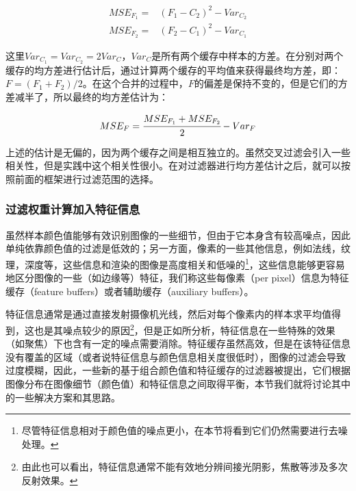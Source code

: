 \begin{equation}
	\begin{aligned}
		MSE_{F_1}=&(F_1-C_2)^{2}-Var_{C_2}\\
		MSE_{F_2}=&(F_2-C_1)^{2}-Var_{C_1}
	\end{aligned}
\end{equation}

\noindent 这里$Var_{C_1}=Var_{C_2}=2Var_C$，$Var_C$是所有两个缓存中样本的方差。在分别对两个缓存的均方差进行估计后，通过计算两个缓存的平均值来获得最终均方差，即：$F=(F_1+F_2)/2$。在这个合并的过程中，$F$的偏差是保持不变的，但是它们的方差减半了，所以最终的均方差估计为：

\begin{equation}
	MSE_F= \cfrac{MSE_{F_1}+MSE_{F_2}}{2}-Var_F
\end{equation}

\noindent 上述的估计是无偏的，因为两个缓存之间是相互独立的。虽然交叉过滤会引入一些相关性，但是实践中这个相关性很小。在对过滤器进行均方差估计之后，就可以按照前面的框架进行过滤范围的选择。







\subsubsection{过滤权重计算加入特征信息}\label{sec:pt-feature-filtering}
虽然样本颜色值能够有效识别图像的一些细节，但由于它本身含有较高噪点，因此单纯依靠颜色值的过滤是低效的；另一方面，像素的一些其他信息，例如法线，纹理，深度等，这些信息和渲染的图像是高度相关和低噪的\footnote{尽管特征信息相对于颜色值的噪点更小，在本节将看到它们仍然需要进行去噪处理。}，这些信息能够更容易地区分图像的一些（如边缘等）特征，我们称这些每像素（per pixel）信息为特征缓存（feature buffers）或者辅助缓存（auxiliary buffers）。

特征信息通常是通过直接发射摄像机光线，然后对每个像素内的样本求平均值得到，这也是其噪点较少的原因\footnote{由此也可以看出，特征信息通常不能有效地分辨间接光阴影，焦散等涉及多次反射效果。}，但是正如\cite{a:OnFilteringtheNoisefromtheRandomParametersinMonteCarloRendering}所分析，特征信息在一些特殊的效果（如聚焦）下也含有一定的噪点需要消除。特征缓存虽然高效，但是在该特征信息没有覆盖的区域（或者说特征信息与颜色信息相关度很低时），图像的过滤会导致过度模糊，因此，一些新的基于组合颜色值和特征缓存的过滤器被提出，它们根据图像分布在图像细节（颜色值）和特征信息之间取得平衡，本节我们就将讨论其中的一些解决方案和其思路。

